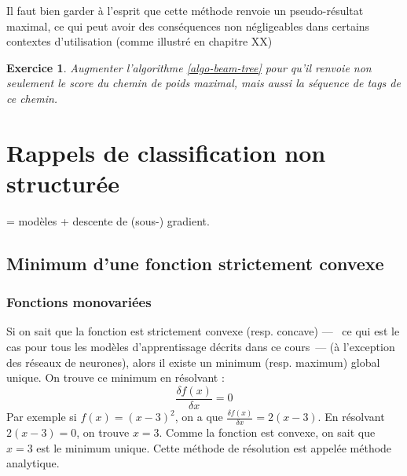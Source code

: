 \documentclass[11pt,openany]{book}
\newtheorem{exo}{Exercice}[chapter]
\begin{document}
Il faut bien garder à l'esprit que cette méthode renvoie un
pseudo-résultat maximal, ce qui peut avoir des conséquences non
négligeables dans certains contextes d'utilisation
(comme illustré en chapitre XX)

\begin{exo}
Augmenter l'algorithme \ref{algo-beam-tree} pour qu'il renvoie
non seulement le score du chemin de poids maximal, mais aussi
la séquence de tags de ce chemin.
\end{exo}

\chapter{Rappels de classification non structurée}

= modèles + descente de (sous-) gradient.

\section{Minimum d'une fonction strictement convexe}


\subsection{Fonctions monovariées}


Si on sait que la fonction est strictement convexe (resp. concave) ---~
 ce qui est le cas pour tous les modèles d'apprentissage décrits dans
 ce cours~--- (à l'exception des réseaux de neurones), alors il existe
 un minimum (resp. maximum) global unique.
On trouve ce minimum en résolvant :
\begin{equation}
\label{eq-derivative}
\frac{\delta f(x)}{\delta x} = 0 
\end{equation}
Par exemple si $f(x) = (x-3)^2$, on a que $\frac{\delta f(x)}{\delta
  x} = 2(x-3)$. En résolvant $2(x-3) = 0$, on trouve $x=3$. Comme la
fonction est convexe, on sait que $x=3$ est le minimum unique.
Cette méthode de résolution est appelée méthode analytique.
\end{document}
